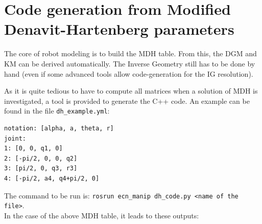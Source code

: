 \documentclass{ecnreport}
\begin{document}
\newpage
\section{Code generation from Modified Denavit-Hartenberg parameters}\label{dhcode}

The core of robot modeling is to build the MDH table. From this, the DGM and KM can be derived automatically. The Inverse Geometry still has to be done by hand (even if some advanced tools allow code-generation for the IG resolution).

As it is quite tedious to have to compute all matrices when a solution of MDH is investigated, a tool is provided to generate the C++ code. An example can be found in the file \texttt{dh\_example.yml}:
\cppstyle
\begin{lstlisting}
notation: [alpha, a, theta, r]
joint:
1: [0, 0, q1, 0]
2: [-pi/2, 0, 0, q2]
3: [pi/2, 0, q3, r3]
4: [-pi/2, a4, q4+pi/2, 0]
\end{lstlisting}
The command to be run is: \texttt{rosrun ecn\_manip dh\_code.py <name of the file>}.\\
In the case of the above MDH table, it leads to these outputs:
\end{document}
